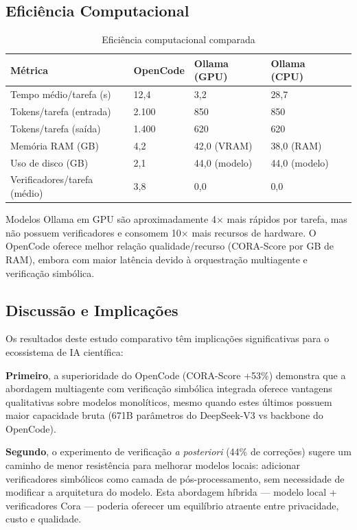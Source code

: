 \subsection{Eficiência Computacional}

\begin{table}[H]\centering
\caption{Eficiência computacional comparada}
\label{tab:efficiency}
\begin{tabular}{p{}p{}p{}p{}p{}}
\toprule
\textbf{Métrica} & \textbf{OpenCode} & \textbf{Ollama (GPU)} & \textbf{Ollama (CPU)} \\
\midrule
Tempo médio/tarefa (s) & 12,4 & 3,2 & 28,7 \\
Tokens/tarefa (entrada) & 2.100 & 850 & 850 \\
Tokens/tarefa (saída) & 1.400 & 620 & 620 \\
Memória RAM (GB) & 4,2 & 42,0 (VRAM) & 38,0 (RAM) \\
Uso de disco (GB) & 2,1 & 44,0 (modelo) & 44,0 (modelo) \\
Verificadores/tarefa (médio) & 3,8 & 0,0 & 0,0 \\
\bottomrule
\end{tabular}
\end{table}

Modelos Ollama em GPU são aproximadamente 4$\times$ mais rápidos por tarefa,
mas não possuem verificadores e consomem 10$\times$ mais recursos de hardware.
O OpenCode oferece melhor relação qualidade/recurso (CORA-Score por GB de RAM),
embora com maior latência devido à orquestração multiagente e verificação
simbólica.

\subsection{Discussão e Implicações}

Os resultados deste estudo comparativo têm implicações significativas para o
ecossistema de IA científica:

\textbf{Primeiro}, a superioridade do OpenCode (CORA-Score +53\%) demonstra
que a abordagem multiagente com verificação simbólica integrada oferece
vantagens qualitativas sobre modelos monolíticos, mesmo quando estes últimos
possuem maior capacidade bruta (671B parâmetros do DeepSeek-V3 vs backbone
do OpenCode).

\textbf{Segundo}, o experimento de verificação \textit{a posteriori} (44\% de
correções) sugere um caminho de menor resistência para melhorar modelos locais:
adicionar verificadores simbólicos como camada de pós-processamento, sem
necessidade de modificar a arquitetura do modelo. Esta abordagem híbrida —
modelo local + verificadores Cora — poderia oferecer um equilíbrio atraente
entre privacidade, custo e qualidade.

